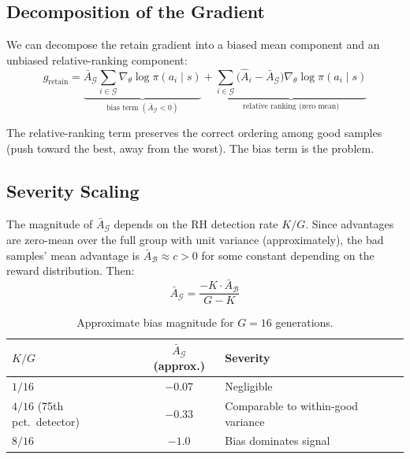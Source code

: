 \documentclass[11pt]{article}
\begin{document}
\subsection{Decomposition of the Gradient}

We can decompose the retain gradient into a biased mean component and an
unbiased relative-ranking component:
\begin{equation}\label{eq:decomposition}
    \hat{g}_{\text{retain}}
    = \underbrace{\bar{A}_{\mathcal{G}}
        \sum_{i \in \mathcal{G}} \nabla_\theta \log \pi(a_i \mid s)
    }_{\text{bias term } (\bar{A}_{\mathcal{G}} < 0)}
    + \underbrace{\sum_{i \in \mathcal{G}}
        \bigl(\hat{A}_i - \bar{A}_{\mathcal{G}}\bigr)
        \nabla_\theta \log \pi(a_i \mid s)
    }_{\text{relative ranking (zero mean)}}
\end{equation}

The relative-ranking term preserves the correct ordering among good samples
(push toward the best, away from the worst). The bias term is the problem.

\subsection{Severity Scaling}

The magnitude of $\bar{A}_{\mathcal{G}}$ depends on the RH detection rate
$K/G$. Since advantages are zero-mean over the full group with unit variance
(approximately), the bad samples' mean advantage is $\bar{A}_{\mathcal{B}}
\approx c > 0$ for some constant depending on the reward distribution. Then:
\begin{equation}
    \bar{A}_{\mathcal{G}} = \frac{-K \cdot \bar{A}_{\mathcal{B}}}{G - K}
\end{equation}

\begin{table}[h]
\centering
\begin{tabular}{@{}lcl@{}}
\toprule
$K/G$ & $\bar{A}_{\mathcal{G}}$ (approx.) & Severity \\
\midrule
$1/16$ & $-0.07$ & Negligible \\
$4/16$ (75th pct.\ detector) & $-0.33$ & Comparable to within-good variance \\
$8/16$ & $-1.0$ & Bias dominates signal \\
\bottomrule
\end{tabular}
\caption{Approximate bias magnitude for $G=16$ generations.}
\label{tab:severity}
\end{table}
\end{document}
